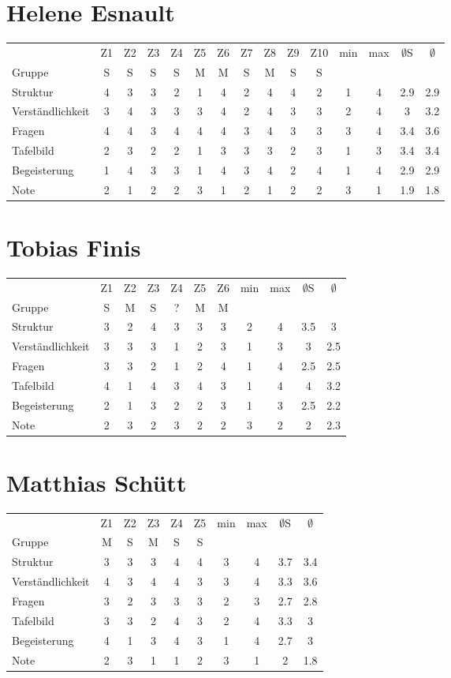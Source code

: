 \documentclass[a4paper]{article}
\begin{document}
\section{Helene Esnault}
\begin{tabular}{l|cccccccccc|cc|cc}
&Z1&Z2&Z3&Z4&Z5&Z6&Z7&Z8&Z9&Z10&min&max&$\emptyset$S&$\emptyset$\\
Gruppe               &S&S&S&S&M&M&S&M&S&S&&&&\\
\hline
Struktur             &4&3&3&2&1&4&2&4&4&2&1&4&2.9&2.9\\
Verst\"andlichkeit   &3&4&3&3&3&4&2&4&3&3&2&4&3&3.2\\
Fragen               &4&4&3&4&4&4&3&4&3&3&3&4&3.4&3.6\\
Tafelbild            &2&3&2&2&1&3&3&3&2&3&1&3&3.4&3.4\\
Begeisterung         &1&4&3&3&1&4&3&4&2&4&1&4&2.9&2.9\\
\hline
Note                 &2&1&2&2&3&1&2&1&2&2&3&1&1.9&1.8
\end{tabular}

\section{Tobias Finis}
\begin{tabular}{l|cccccc|cc|cc}
&Z1&Z2&Z3&Z4&Z5&Z6&min&max&$\emptyset$S&$\emptyset$\\
Gruppe               &S&M&S&?&M&M&&&&\\
\hline
Struktur             &3&2&4&3&3&3&2&4&3.5&3\\
Verst\"andlichkeit   &3&3&3&1&2&3&1&3&3&2.5\\
Fragen               &3&3&2&1&2&4&1&4&2.5&2.5\\
Tafelbild            &4&1&4&3&4&3&1&4&4&3.2\\
Begeisterung         &2&1&3&2&2&3&1&3&2.5&2.2\\
\hline
Note                 &2&3&2&3&2&2&3&2&2&2.3
\end{tabular}

\section{Matthias Sch\"utt}
\begin{tabular}{l|ccccc|cc|cc}
&Z1&Z2&Z3&Z4&Z5&min&max&$\emptyset$S&$\emptyset$\\
Gruppe               &M&S&M&S&S&&&&\\
\hline
Struktur             &3&3&3&4&4&3&4&3.7&3.4\\
Verst\"andlichkeit   &4&3&4&4&3&3&4&3.3&3.6\\
Fragen               &3&2&3&3&3&2&3&2.7&2.8\\
Tafelbild            &3&3&2&4&3&2&4&3.3&3\\
Begeisterung         &4&1&3&4&3&1&4&2.7&3\\
\hline
Note                 &2&3&1&1&2&3&1&2&1.8
\end{tabular}
\end{document}
